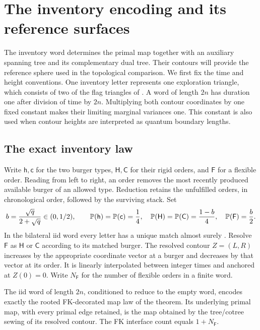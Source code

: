 \section{The inventory encoding and its reference surfaces}
\label{enc:section}

The inventory word determines the primal map together with an auxiliary
spanning tree and its complementary dual tree.  Their contours will
provide the reference sphere used in the topological comparison.
We first fix the time and height conventions.  One inventory letter represents
one exploration triangle, which consists of two of the flag triangles
of .  A word of length $2n$ has duration one
after division of time by $2n$.  Multiplying both contour coordinates by one
fixed constant makes their limiting marginal variances one.  This constant is
also used when contour heights are interpreted as quantum boundary lengths.

\subsection{The exact inventory law}

Write $\mathsf h,\mathsf c$ for the two burger types,
$\mathsf H,\mathsf C$ for their rigid orders, and $\mathsf F$ for a flexible
order.  Reading from left to right, an order removes the most recently
produced available burger of an allowed type.  Reduction retains the
unfulfilled orders, in chronological order, followed by the surviving stack.
Set
\begin{equation}\label{enc:letter-law}
 b=\frac{\sqrt q}{2+\sqrt q}\in(0,1/2),\qquad
 \PP(\mathsf h)=\PP(\mathsf c)=\frac14,\quad
 \PP(\mathsf H)=\PP(\mathsf C)=\frac{1-b}{4},\quad
 \PP(\mathsf F)=\frac b2.
\end{equation}
In the bilateral iid word every letter has a unique match almost surely
\cite[Proposition 2.2]{SheffieldInventory}.  Resolve $\mathsf F$ as
$\mathsf H$ or $\mathsf C$ according to its matched burger.  The resolved
contour $Z=(L,R)$ increases by the appropriate coordinate vector at a burger
and decreases by that vector at its order.  It is linearly interpolated
between integer times and anchored at $Z(0)=0$.  Write $N_{\mathsf F}$
for the number of flexible orders in a finite word.

\begin{proposition}\label{enc:inventory-law}
The iid word of length $2n$, conditioned to reduce to the empty word,
encodes exactly the rooted FK-decorated map law of the theorem.  Its
underlying primal map, with every primal edge retained, is the map obtained
by the tree/cotree sewing of its resolved contour.  The FK interface count
equals $1+N_{\mathsf F}$.
\end{proposition}

